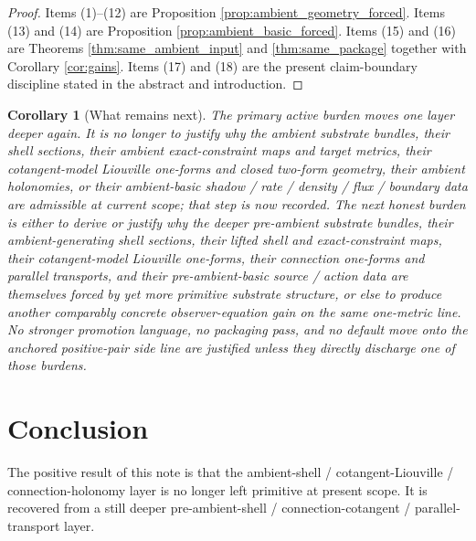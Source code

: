 \documentclass[11pt]{article}
\newtheorem{corollary}{Corollary}
\begin{document}
\begin{proof}
Items (1)--(12) are Proposition \ref{prop:ambient_geometry_forced}. Items (13) and (14) are Proposition \ref{prop:ambient_basic_forced}. Items (15) and (16) are Theorems \ref{thm:same_ambient_input} and \ref{thm:same_package} together with Corollary \ref{cor:gains}. Items (17) and (18) are the present claim-boundary discipline stated in the abstract and introduction.
\end{proof}

\begin{corollary}[What remains next]
\label{cor:what_next}
The primary active burden moves one layer deeper again. It is no longer to justify why the ambient substrate bundles, their shell sections, their ambient exact-constraint maps and target metrics, their cotangent-model Liouville one-forms and closed two-form geometry, their ambient holonomies, or their ambient-basic shadow / rate / density / flux / boundary data are admissible at current scope; that step is now recorded. The next honest burden is either to derive or justify why the deeper pre-ambient substrate bundles, their ambient-generating shell sections, their lifted shell and exact-constraint maps, their cotangent-model Liouville one-forms, their connection one-forms and parallel transports, and their pre-ambient-basic source / action data are themselves forced by yet more primitive substrate structure, or else to produce another comparably concrete observer-equation gain on the same one-metric line. No stronger promotion language, no packaging pass, and no default move onto the anchored positive-pair side line are justified unless they directly discharge one of those burdens.
\end{corollary}

\section{Conclusion}

The positive result of this note is that the ambient-shell / cotangent-Liouville / connection-holonomy layer is no longer left primitive at present scope. It is recovered from a still deeper pre-ambient-shell / connection-cotangent / parallel-transport layer.
\end{document}
